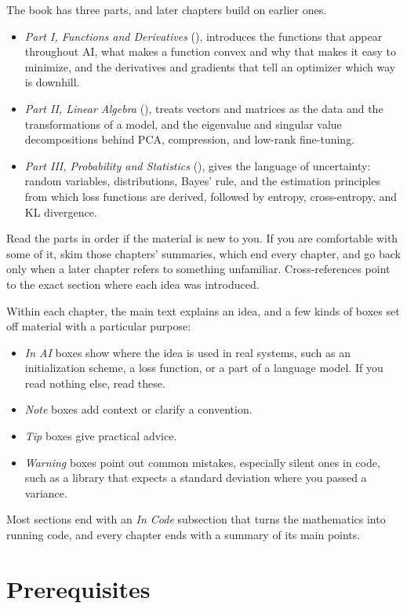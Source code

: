 The book has three parts, and later chapters build on earlier ones.
\begin{itemize}
  \item \emph{Part I, Functions and Derivatives} (),
    introduces the functions that appear throughout AI, what makes a
    function convex and why that makes it easy to minimize, and the
    derivatives and gradients that tell an optimizer which way is
    downhill.
  \item \emph{Part II, Linear Algebra} (), treats
    vectors and matrices as the data and the transformations of a model,
    and the eigenvalue and singular value decompositions behind PCA,
    compression, and low-rank fine-tuning.
  \item \emph{Part III, Probability and Statistics}
    (), gives the language of
    uncertainty: random variables, distributions, Bayes' rule,
    and the estimation principles from which loss functions are
    derived, followed by entropy, cross-entropy, and KL divergence.
\end{itemize}
Read the parts in order if the material is new to you. If you are
comfortable with some of it, skim those chapters' summaries, which end
every chapter, and go back only when a later chapter refers to something
unfamiliar. Cross-references point to the exact section where each idea
was introduced.

Within each chapter, the main text explains an idea, and a few kinds of
boxes set off material with a particular purpose:
\begin{itemize}
  \item \emph{In AI} boxes show where the idea is used in real systems,
    such as an initialization scheme, a loss function, or a part of a
    language model. If you read nothing else, read these.
  \item \emph{Note} boxes add context or clarify a convention.
  \item \emph{Tip} boxes give practical advice.
  \item \emph{Warning} boxes point out common mistakes, especially
    silent ones in code, such as a library that expects a standard
    deviation where you passed a variance.
\end{itemize}
Most sections end with an \emph{In Code} subsection that turns the
mathematics into running code, and every chapter ends with a summary of
its main points.

\section*{Prerequisites}

